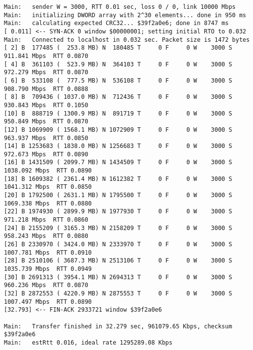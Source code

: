 \documentclass[11pt]{article}
\begin{document}
\begin{lstlisting}[label=app-trace,caption={Trace for $W=3000$ and 1,472 byte packets}]
Main:   sender W = 3000, RTT 0.01 sec, loss 0 / 0, link 10000 Mbps
Main:   initializing DWORD array with 2^30 elements... done in 950 ms
Main:   calculating expected CRC32... $39f2a0e6; done in 8747 ms
[ 0.011] <-- SYN-ACK 0 window $00000001; setting initial RTO to 0.032
Main:   Connected to localhost in 0.032 sec. Packet size is 1472 bytes
[ 2] B  177485 (  253.8 MB) N  180485 T     0 F     0 W    3000 S   911.841 Mbps  RTT 0.0870
[ 4] B  361103 (  523.9 MB) N  364103 T     0 F     0 W    3000 S   972.279 Mbps  RTT 0.0870
[ 6] B  533108 (  777.5 MB) N  536108 T     0 F     0 W    3000 S   908.790 Mbps  RTT 0.0888
[ 8] B  709436 ( 1037.0 MB) N  712436 T     0 F     0 W    3000 S   930.843 Mbps  RTT 0.1050
[10] B  888719 ( 1300.9 MB) N  891719 T     0 F     0 W    3000 S   950.849 Mbps  RTT 0.0870
[12] B 1069909 ( 1568.1 MB) N 1072909 T     0 F     0 W    3000 S   963.937 Mbps  RTT 0.0850
[14] B 1253683 ( 1838.0 MB) N 1256683 T     0 F     0 W    3000 S   972.673 Mbps  RTT 0.0890
[16] B 1431509 ( 2099.7 MB) N 1434509 T     0 F     0 W    3000 S  1038.092 Mbps  RTT 0.0890
[18] B 1609382 ( 2361.4 MB) N 1612382 T     0 F     0 W    3000 S  1041.312 Mbps  RTT 0.0850
[20] B 1792500 ( 2631.1 MB) N 1795500 T     0 F     0 W    3000 S  1069.338 Mbps  RTT 0.0880
[22] B 1974930 ( 2899.9 MB) N 1977930 T     0 F     0 W    3000 S   971.218 Mbps  RTT 0.0860
[24] B 2155209 ( 3165.3 MB) N 2158209 T     0 F     0 W    3000 S   958.243 Mbps  RTT 0.0880
[26] B 2330970 ( 3424.0 MB) N 2333970 T     0 F     0 W    3000 S  1007.781 Mbps  RTT 0.0910
[28] B 2510106 ( 3687.3 MB) N 2513106 T     0 F     0 W    3000 S  1035.739 Mbps  RTT 0.0949
[30] B 2691313 ( 3954.1 MB) N 2694313 T     0 F     0 W    3000 S   960.236 Mbps  RTT 0.0870
[32] B 2872553 ( 4220.9 MB) N 2875553 T     0 F     0 W    3000 S  1007.497 Mbps  RTT 0.0890
[32.793] <-- FIN-ACK 2933721 window $39f2a0e6

Main:   Transfer finished in 32.279 sec, 961079.65 Kbps, checksum $39f2a0e6
Main:   estRtt 0.016, ideal rate 1295289.08 Kbps
\end{lstlisting}
\end{document}
